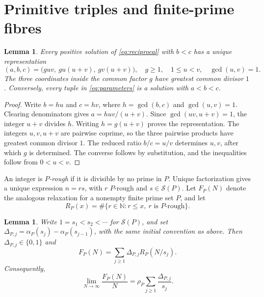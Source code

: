 \documentclass[11pt]{amsart}
\newtheorem{lemma}[theorem]{Lemma}
\theoremstyle{definition}
\theoremstyle{remark}
\numberwithin{equation}{section}
\newcommand{\N}{\mathbb N}
\newcommand{\Sp}{\mathcal S}
\begin{document}
\section{Primitive triples and finite-prime fibres}\label{sec:fibres}

\begin{lemma}\label{lem:parameters}
Every positive solution of \eqref{eq:reciprocal} with $b<c$ has a unique representation
\begin{equation}\label{eq:parameters}
(a,b,c)=\bigl(guv,\ gu(u+v),\ gv(u+v)\bigr),
\quad g\ge1,\quad 1\le u<v,\quad \gcd(u,v)=1.
\end{equation}
The three coordinates inside the common factor $g$ have greatest common divisor $1$.
Conversely, every tuple in \eqref{eq:parameters} is a solution with $a<b<c$.
\end{lemma}

\begin{proof}
Write $b=hu$ and $c=hv$, where $h=\gcd(b,c)$ and $\gcd(u,v)=1$.
Clearing denominators gives $a=huv/(u+v)$.
Since $\gcd(uv,u+v)=1$, the integer $u+v$ divides $h$.
Writing $h=g(u+v)$ proves the representation.
The integers $u,v,u+v$ are pairwise coprime, so the three pairwise products have greatest common divisor $1$.
The reduced ratio $b/c=u/v$ determines $u,v$, after which $g$ is determined.
The converse follows by substitution, and the inequalities follow from $0<u<v$.
\end{proof}

An integer is \emph{$P$-rough} if it is divisible by no prime in $P$.
Unique factorization gives a unique expression $n=rs$, with $r$ $P$-rough and $s\in\Sp(P)$.
Let $F_P(N)$ denote the analogous relaxation for a nonempty finite prime set $P$, and let
\[
R_P(x)=\#\{r\in\N:r\le x,\ r\text{ is }P\text{-rough}\}.
\]

\begin{lemma}\label{lem:fibreidentity}
Write $1=s_1<s_2<\cdots$ for $\Sp(P)$, and set
$\Delta_{P,j}=\alpha_P(s_j)-\alpha_P(s_{j-1})$, with the same initial convention as above.
Then $\Delta_{P,j}\in\{0,1\}$ and
\begin{equation}\label{eq:fibreidentity}
F_P(N)=\sum_{j\ge1}\Delta_{P,j}R_P(N/s_j).
\end{equation}
Consequently,
\begin{equation}\label{eq:fixedlimit}
\lim_{N\to\infty}\frac{F_P(N)}N
=\rho_P\sum_{j\ge1}\frac{\Delta_{P,j}}{s_j}.
\end{equation}
\end{lemma}
\end{document}
